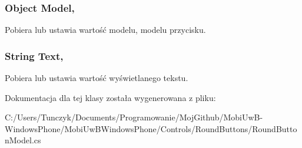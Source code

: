 \subsubsection[{Model}]{\setlength{\rightskip}{0pt plus 5cm}Object Model\hspace{0.3cm}{\ttfamily [get]}, {\ttfamily [set]}}\label{a00051_a112d22ccb92c533c7b30e93ab0d830d4}


Pobiera lub ustawia wartość modelu, modelu przycisku. 

\hypertarget{a00051_a77c3dc3cd51816d77a5742efbfa3d55c}{}
\subsubsection[{Text}]{\setlength{\rightskip}{0pt plus 5cm}String Text\hspace{0.3cm}{\ttfamily [get]}, {\ttfamily [set]}}\label{a00051_a77c3dc3cd51816d77a5742efbfa3d55c}


Pobiera lub ustawia wartość wyświetlanego tekstu. 



Dokumentacja dla tej klasy została wygenerowana z pliku\+:\begin{DoxyCompactItemize}
\item 
C\+:/\+Users/\+Tunczyk/\+Documents/\+Programowanie/\+Moj\+Github/\+Mobi\+Uw\+B-\/\+Windows\+Phone/\+Mobi\+Uw\+B\+Windows\+Phone/\+Controls/\+Round\+Buttons/Round\+Button\+Model.\+cs\end{DoxyCompactItemize}
